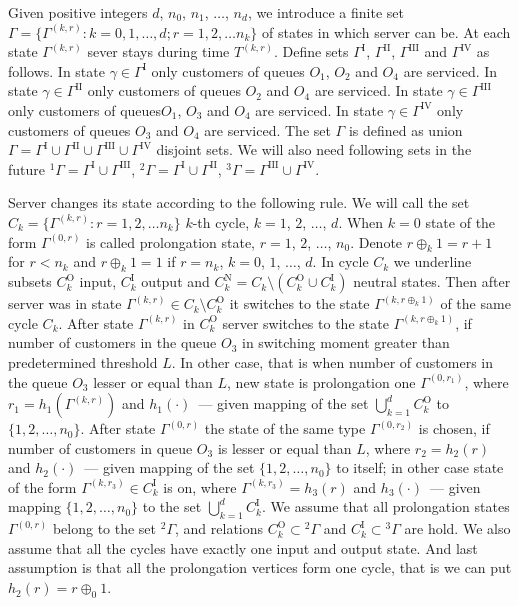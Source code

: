 \documentclass[10pt]{article}
\begin{document}
Given positive integers $d$, $n_0$, $n_1$, $\ldots$, $n_d$, we introduce a finite set $\Gamma=\{\Gamma^{(k,r)} \colon k=0,1,\ldots,d; r=1,2,\ldots n_k\}$ of states in which server can be. At each state $\Gamma^{(k,r)}$ sever stays during time $T^{(k,r)}$. Define sets $\Gamma^{\mathrm{I}}$, $\Gamma^{\mathrm{II}}$, $\Gamma^{\mathrm{III}}$ and $\Gamma^{\mathrm{IV}}$ as follows. 
In state $\gamma \in \Gamma^{\mathrm{I}}$ only customers of queues $O_1$, $O_2$ and $O_4$ are serviced.
In state $\gamma \in \Gamma^{\mathrm{II}}$ only customers of queues $O_2$ and $O_4$ are serviced.
In state $\gamma \in \Gamma^{\mathrm{III}}$ only customers of queues$O_1$, $O_3$ and $O_4$ are serviced.
In state $\gamma \in \Gamma^{\mathrm{IV}}$ only customers of queues $O_3$ and $O_4$ are serviced.
The set $\Gamma$ is defined as union $\Gamma = \Gamma^{\mathrm{I}} \cup \Gamma^{\mathrm{II}} \cup \Gamma^{\mathrm{III}} \cup \Gamma^{\mathrm{IV}}$ disjoint sets. We will also need following sets in the future ${}^1\Gamma=\Gamma^{\mathrm{I}} \cup \Gamma^{\mathrm{III}}$, 
${}^2\Gamma=\Gamma^{\mathrm{I}} \cup \Gamma^{\mathrm{II}}$,
${}^3\Gamma=\Gamma^{\mathrm{III}} \cup \Gamma^{\mathrm{IV}}$. 

Server changes its state according to the following rule. We will call the set $C_k = \{\Gamma^{(k,r)} \colon r=1,2,\ldots n_k\}$  $k$-th cycle, $k=1$, $2$, $\ldots$, $d$. When $k=0$ state of the form 
$\Gamma^{(0,r)}$ is called prolongation state, $r=1$, $2$, $\ldots$, $n_0$. Denote $r \oplus_k 1 = r+1$ for $r<n_k$ and $r \oplus_k 1 = 1$ if $r=n_k$, $k = 0$, $1$, $\ldots$, $d$. In cycle $C_k$ we underline  subsets $C_k^{\mathrm{O}}$ input, $C_k^{\mathrm{I}}$ output and $C_k^{\mathrm{N}} = C_k \setminus (C_k^{\mathrm{O}} \cup C_k^{\mathrm{I}})$ neutral states. 
Then  after server was in state $\Gamma^{(k,r)} \in C_k\setminus C_k^{\mathrm{O}}$ it switches to the state $\Gamma^{(k,r \oplus_k 1)}$ of the same cycle $C_k$. 
After state $\Gamma^{(k,r)}$ in $C_k^{\mathrm{O}}$ server switches to the state $\Gamma^{(k,r \oplus_k 1)}$, if number of customers in the queue $O_3$ in switching moment greater than predetermined threshold $L$. 
In other case,  that is when number of customers in the queue $O_3$ lesser or equal than $L$, new state is prolongation one $\Gamma^{(0,r_1)}$, where $r_1=h_1(\Gamma^{(k,r)})$ and
$h_1(\cdot)$~--- given mapping of the set 
$\bigcup\limits_{k=1}^d C_k^{\mathrm{O}}$ to $\{1,2,\ldots, n_0\}$. 
After state $\Gamma^{(0,r)}$ the state of the same type $\Gamma^{(0,r_2)}$ is chosen, if number of customers in queue $O_3$ is lesser or equal than $L$, where $r_2=h_2(r)$ and $h_2(\cdot)$~--- given mapping of the 
set $\{1,2, \ldots, n_0\}$ to itself; in other case state of the form $\Gamma^{(k,r_3)} \in C_k^{\mathrm{I}}$ is on, where $\Gamma^{(k,r_3)}=h_3(r)$ and $h_3(\cdot)$~--- given mapping $\{1,2, \ldots, n_0\}$ to the set  $\bigcup\limits_{k=1}^d C_k^{\mathrm{I}}$. We assume that all prolongation states $\Gamma^{(0,r)}$ belong to the set ${}^2 \Gamma$, and  relations $C_k^\mathrm{O}\subset {}^2 \Gamma$ and $C_k^\mathrm{I}\subset {}^3 \Gamma$ are hold. We also assume that all the cycles have exactly one input and output state. And last assumption is that all the prolongation vertices form one cycle, that is we can put $h_2(r)=r\oplus_0 1$.
\end{document}
